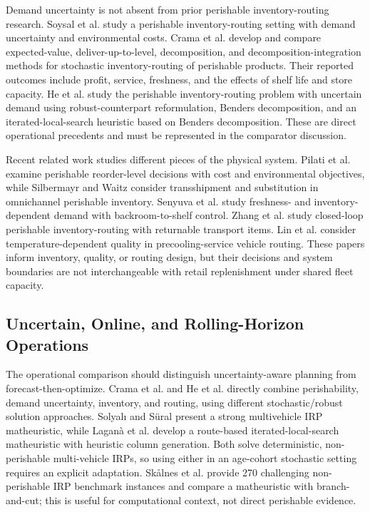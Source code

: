 \documentclass[11pt,a4paper]{article}
\theoremstyle{definition}
\theoremstyle{remark}
\begin{document}
Demand uncertainty is not absent from prior perishable inventory-routing research. Soysal et al. \citeyearpar{soysal2015modeling} study a perishable inventory-routing setting with demand uncertainty and environmental costs. Crama et al. \citeyearpar{archetti2018stochastic} develop and compare expected-value, deliver-up-to-level, decomposition, and decomposition-integration methods for stochastic inventory-routing of perishable products. Their reported outcomes include profit, service, freshness, and the effects of shelf life and store capacity. He et al. \citeyearpar{he2024robust} study the perishable inventory-routing problem with uncertain demand using robust-counterpart reformulation, Benders decomposition, and an iterated-local-search heuristic based on Benders decomposition. These are direct operational precedents and must be represented in the comparator discussion.

Recent related work studies different pieces of the physical system. Pilati et al. \citeyearpar{pilati2024environmentally} examine perishable reorder-level decisions with cost and environmental objectives, while Silbermayr and Waitz \citeyearpar{silbermayr2024omni} consider transshipment and substitution in omnichannel perishable inventory. Senyuva et al. \citeyearpar{senyuva2026perishable} study freshness- and inventory-dependent demand with backroom-to-shelf control. Zhang et al. \citeyearpar{zhang2024closed} study closed-loop perishable inventory-routing with returnable transport items. Lin et al. \citeyearpar{lin2025precooling} consider temperature-dependent quality in precooling-service vehicle routing. These papers inform inventory, quality, or routing design, but their decisions and system boundaries are not interchangeable with retail replenishment under shared fleet capacity.

\subsection{Uncertain, Online, and Rolling-Horizon Operations}
\label{subsec:lit_uncertainty}

The operational comparison should distinguish uncertainty-aware planning from forecast-then-optimize. Crama et al. \citeyearpar{archetti2018stochastic} and He et al. \citeyearpar{he2024robust} directly combine perishability, demand uncertainty, inventory, and routing, using different stochastic/robust solution approaches. Solyal\i{} and S{\"u}ral \citeyearpar{solyali2022multi} present a strong multivehicle IRP matheuristic, while Laganà et al. \citeyearpar{lagana2024ils} develop a route-based iterated-local-search matheuristic with heuristic column generation. Both solve deterministic, non-perishable multi-vehicle IRPs, so using either in an age-cohort stochastic setting requires an explicit adaptation. Sk\aa lnes et al. \citeyearpar{skalnes2024new} provide 270 challenging non-perishable IRP benchmark instances and compare a matheuristic with branch-and-cut; this is useful for computational context, not direct perishable evidence.
\end{document}
